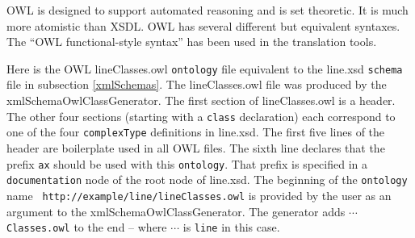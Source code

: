 \documentclass[preprint,12pt]{elsarticle}
\begin{document}
OWL is designed to support automated reasoning and is set theoretic. It is
much more atomistic than XSDL. OWL has several different but equivalent
syntaxes. The “OWL functional-style syntax” has been used in the
translation tools.

Here is the OWL lineClasses.owl {\tt ontology} file equivalent to the
line.xsd {\tt schema} file in subsection \ref{xmlSchemas}. The
lineClasses.owl file was produced by the xmlSchemaOwlClassGenerator. The
first section of lineClasses.owl is a header. The other four sections
(starting with a {\tt class} declaration) each correspond to one of the
four {\tt complexType} definitions in line.xsd. The first five lines of the
header are boilerplate used in all OWL files. The sixth line declares that
the prefix {\tt ax} should be used with this {\tt ontology}. That prefix is
specified in a {\tt documentation} node of the root node of line.xsd. The
beginning of the {\tt ontology} name {\tt
  http://example/line/lineClasses.owl} is provided by the user as an
argument to the xmlSchemaOwlClassGenerator. The generator adds $\cdots${\tt
  Classes.owl} to the end -- where $\cdots$ is {\tt line} in this case.
\end{document}
